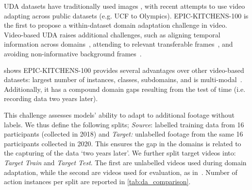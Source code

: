 \RequirePackage{amsmath} \documentclass[runningheads]{llncs}
\makeatletter
\newcommand{\chParagraph}[1]{\noindent {\textbf{#1.}} \hspace{6pt}}
\newcommand {\newDataset} {EPIC-KITCHENS-100}
\newcommand*{\eg}{e.g.\@\xspace}
\newcommand*{\ie}{i.e.\@\xspace}
\makeatother
\begin{document}
\chParagraph{Related Datasets}
UDA datasets have traditionally used images \cite{Saenko2010,Venkateswara2017,Peng2017,Peng2019}, with recent attempts to use video~ \cite{jamal2018deep,Chen2019,qi2018unified} adapting across public datasets (\eg UCF to Olympics). \newDataset{} is the first to propose a within-dataset domain adaptation challenge in video.
Video-based UDA raises additional challenges, such as aligning temporal information across domains~\cite{jamal2018deep}, attending to relevant transferable frames~\cite{Chen2019}, and avoiding non-informative background frames~\cite{pan2019adversarial}.  

 shows 
\newDataset{} provides 
several advantages over other video-based datasets: largest number of instances, classes, subdomains, and is multi-modal~\cite{munro2020multi}.  
Additionally, it has a compound domain gaps resulting from the test of time (\ie recording data two years later).

\chParagraph{Splits}
This challenge assesses models' ability to adapt to additional footage without labels. We thus define the following splits; \textit{Source}: labelled training data from 16 participants (collected in 2018) and \textit{Target:} unlabelled footage from the same 16 participants collected in 2020. This ensures the gap in the domains is related to the capturing of the data `two years later'. We further split target videos into: \textit{Target Train} and \textit{Target Test}. The first are unlabelled videos used during domain adaptation, while the second are videos used for evaluation, as in~\cite{Peng2017}. Number of action instances per split are reported in \cref{tab:da_comparison}. 
\end{document}
